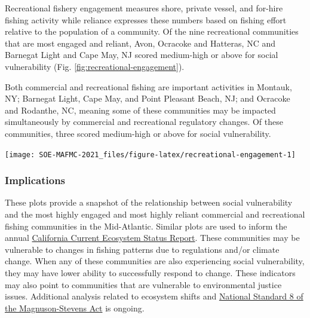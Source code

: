 \documentclass[
  10pt,
]{article}
\let\origfigure\figure
\let\endorigfigure\endfigure
\renewenvironment{figure}[1][2] {
    \expandafter\origfigure\expandafter[H]
} {
    \endorigfigure
}
\begin{document}
Recreational fishery engagement measures shore, private vessel, and
for-hire fishing activity while reliance expresses these numbers based
on fishing effort relative to the population of a community. Of the nine
recreational communities that are most engaged and reliant, Avon,
Ocracoke and Hatteras, NC and Barnegat Light and Cape May, NJ scored
medium-high or above for social vulnerability (Fig.
\ref{fig:recreational-engagement}).

Both commercial and recreational fishing are important activities in
Montauk, NY; Barnegat Light, Cape May, and Point Pleasant Beach, NJ; and
Ocracoke and Rodanthe, NC, meaning some of these communities may be
impacted simultaneously by commercial and recreational regulatory
changes. Of these communities, three scored medium-high or above for
social vulnerability.

\begin{figure}

{\centering \texttt{[image: SOE-MAFMC-2021\_files/figure-latex/recreational-engagement-1]} 

}

\caption{Recreational engagement, reliance, and social vulnerability for the top recreational fishing communities in the Mid-Atlantic.}\label{fig:recreational-engagement}
\end{figure}

\hypertarget{implications-4}{%
\subsubsection{Implications}\label{implications-4}}

These plots provide a snapshot of the relationship between social
vulnerability and the most highly engaged and most highly reliant
commercial and recreational fishing communities in the Mid-Atlantic.
Similar plots are used to inform the annual
\href{https://www.pcouncil.org/documents/2020/02/g-1-a-iea-team-report-1.pdf/}{California
Current Ecosystem Status Report}. These communities may be vulnerable to
changes in fishing patterns due to regulations and/or climate change.
When any of these communities are also experiencing social
vulnerability, they may have lower ability to successfully respond to
change. These indicators may also point to communities that are
vulnerable to environmental justice issues. Additional analysis related
to ecosystem shifts and
\href{https://www.ecfr.gov/cgi-bin/retrieveECFR?gp=\&SID=6b0acea089174af8594db02314f26914\&mc=true\&r=SECTION\&n=se50.12.600_1345}{National
Standard 8 of the Magnuson-Stevens Act} is ongoing.
\end{document}
